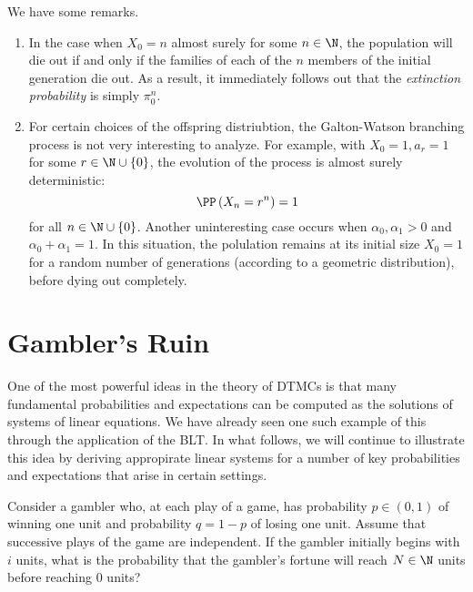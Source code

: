 \documentclass[stat333]{subfiles}
\begin{document}
    \np We have some remarks.
    \begin{enumerate}
        \item In the case when $X_0=n$ almost surely for some $n\in\N$, the population will die out if and only if the families of each of the $n$ members of the initial generation die out. As a result, it immediately follows out that the \textit{extinction probability} is simply $\pi_0^n$.

        \item For certain choices of the offspring distriubtion, the Galton-Watson branching process is not very interesting to analyze. For example, with $X_0=1, a_r=1$ for some $r\in\N\cup\left\lbrace 0 \right\rbrace$, the evolution of the process is almost surely deterministic:
            \begin{equation*}
                \PP\left( X_n=r^n \right) = 1
            \end{equation*}
            for all $n\in\N\cup\left\lbrace 0 \right\rbrace$. Another uninteresting case occurs when $\alpha_0,\alpha_1>0$ and $\alpha_0+\alpha_1=1$. In this situation, the polulation remains at its initial size $X_0=1$ for a random number of generations (according to a geometric distribution), before dying out completely.
    \end{enumerate}

    \section{Gambler's Ruin}

    \np One of the most powerful ideas in the theory of DTMCs is that many fundamental probabilities and expectations can be computed as the solutions of systems of linear equations. We have already seen one such example of this through the application of the BLT. In what follows, we will continue to illustrate this idea by deriving appropirate linear systems for a number of key probabilities and expectations that arise in certain settings.

    Consider a gambler who, at each play of a game, has probability $p\in\left( 0,1 \right)$ of winning one unit and probability $q=1-p$ of losing one unit. Assume that successive plays of the game are independent. If the gambler initially begins with $i$ units, what is the probability that the gambler's fortune will reach $N\in\N$ units before reaching $0$ units?
\end{document}
